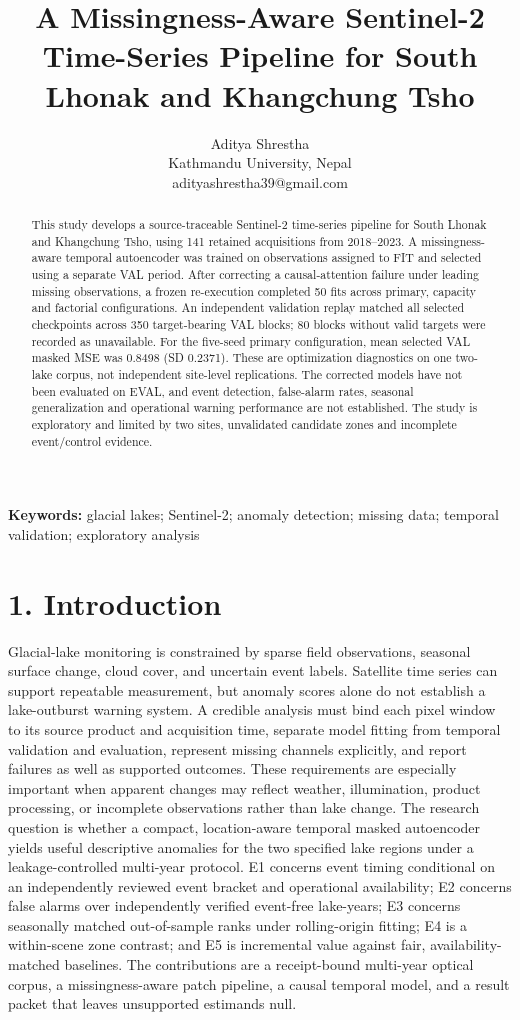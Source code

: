 \documentclass[9pt,twocolumn]{article}
\title{\bfseries A Missingness-Aware Sentinel-2 Time-Series Pipeline for South Lhonak and Khangchung Tsho}
\author{Aditya Shrestha\\\small Kathmandu University, Nepal\\\small adityashrestha39@gmail.com}
\date{}
\begin{document}
\maketitle
\begin{abstract}This study develops a source-traceable Sentinel-2 time-series pipeline for South Lhonak and Khangchung Tsho, using 141 retained acquisitions from 2018--2023. A missingness-aware temporal autoencoder was trained on observations assigned to FIT and selected using a separate VAL period. After correcting a causal-attention failure under leading missing observations, a frozen re-execution completed 50 fits across primary, capacity and factorial configurations. An independent validation replay matched all selected checkpoints across 350 target-bearing VAL blocks; 80 blocks without valid targets were recorded as unavailable. For the five-seed primary configuration, mean selected VAL masked MSE was 0.8498 (SD 0.2371). These are optimization diagnostics on one two-lake corpus, not independent site-level replications. The corrected models have not been evaluated on EVAL, and event detection, false-alarm rates, seasonal generalization and operational warning performance are not established. The study is exploratory and limited by two sites, unvalidated candidate zones and incomplete event/control evidence.\end{abstract}
\noindent\textbf{Keywords:} glacial lakes; Sentinel-2; anomaly detection; missing data; temporal validation; exploratory analysis
\section*{1. Introduction}
Glacial-lake monitoring is constrained by sparse field observations, seasonal surface change, cloud cover, and uncertain event labels. Satellite time series can support repeatable measurement, but anomaly scores alone do not establish a lake-outburst warning system. A credible analysis must bind each pixel window to its source product and acquisition time, separate model fitting from temporal validation and evaluation, represent missing channels explicitly, and report failures as well as supported outcomes. These requirements are especially important when apparent changes may reflect weather, illumination, product processing, or incomplete observations rather than lake change.
The research question is whether a compact, location-aware temporal masked autoencoder yields useful descriptive anomalies for the two specified lake regions under a leakage-controlled multi-year protocol. E1 concerns event timing conditional on an independently reviewed event bracket and operational availability; E2 concerns false alarms over independently verified event-free lake-years; E3 concerns seasonally matched out-of-sample ranks under rolling-origin fitting; E4 is a within-scene zone contrast; and E5 is incremental value against fair, availability-matched baselines. The contributions are a receipt-bound multi-year optical corpus, a missingness-aware patch pipeline, a causal temporal model, and a result packet that leaves unsupported estimands null.
\end{document}
